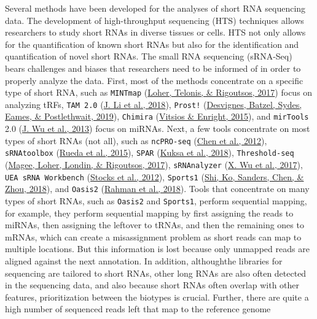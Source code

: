 \documentclass[12pt,twoside]{reedthesis}
\begin{document}
Several methods have been developed for the analyses of short RNA
sequencing data. The development of high-throughput sequencing (HTS)
techniques allows researchers to study short RNAs in diverse tissues or
cells. HTS not only allows for the quantification of known short RNAs
but also for the identification and quantification of novel short RNAs.
The small RNA sequencing (sRNA-Seq) bears challenges and biases that
researchers need to be informed of in order to properly analyze the
data. First, most of the methods concentrate on a specific type of short
RNA, such as \texttt{MINTmap} (\protect\hyperlink{ref-loher2017}{Loher, Telonis, \& Rigoutsos, 2017}) focus on analyzing tRFs, \texttt{TAM\ 2.0}
(\protect\hyperlink{ref-li2018}{J. Li et al., 2018}), \texttt{Prost!} (\protect\hyperlink{ref-desvignes2019}{Desvignes, Batzel, Sydes, Eames, \& Postlethwait, 2019}), \texttt{Chimira} (\protect\hyperlink{ref-vitsios2015}{Vitsios \& Enright, 2015}), and \texttt{mirTools}
2.0 (\protect\hyperlink{ref-wu2013}{J. Wu et al., 2013}) focus on miRNAs. Next, a few tools concentrate on most
types of short RNAs (not all), such as \texttt{ncPRO-seq} (\protect\hyperlink{ref-chen2012}{Chen et al., 2012}),
\texttt{sRNAtoolbox} (\protect\hyperlink{ref-rueda2015}{Rueda et al., 2015}), \texttt{SPAR} (\protect\hyperlink{ref-kuksa2018}{Kuksa et al., 2018}), \texttt{Threshold-seq} (\protect\hyperlink{ref-magee2017}{Magee, Loher, Londin, \& Rigoutsos, 2017}),
\texttt{sRNAnalyzer} (\protect\hyperlink{ref-wu2017}{X. Wu et al., 2017}), \texttt{UEA\ sRNA\ Workbench} (\protect\hyperlink{ref-stocks2012}{Stocks et al., 2012}), \texttt{Sports1}
(\protect\hyperlink{ref-shi2018}{Shi, Ko, Sanders, Chen, \& Zhou, 2018}), and \texttt{Oasis2} (\protect\hyperlink{ref-rahman2018}{Rahman et al., 2018}). Tools that concentrate on many
types of short RNAs, such as \texttt{Oasis2} and \texttt{Sports1}, perform sequential
mapping, for example, they perform sequential mapping by first assigning
the reads to miRNAs, then assigning the leftover to tRNAs, and then the
remaining ones to mRNAs, which can create a misassignment problem as
short reads can map to multiple locations. But this information is lost
because only unmapped reads are aligned against the next annotation. In
addition, althoughthe libraries for sequencing are tailored to short
RNAs, other long RNAs are also often detected in the sequencing data,
and also because short RNAs often overlap with other features,
prioritization between the biotypes is crucial. Further, there are quite
a high number of sequenced reads left that map to the reference genome
\end{document}
